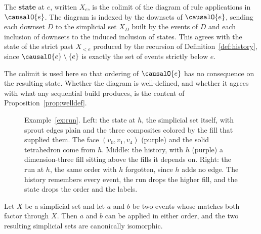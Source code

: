 \begin{definition}[State]
\label{def:state}
The \textbf{state} at $e$, written $X_e$, is the colimit of the diagram of rule applications in $\causalO{e}$.
The diagram is indexed by the downsets of $\causalO{e}$, sending each downset $D$ to the simplicial set $X_D$ built by the events of $D$ and each inclusion of downsets to the induced inclusion of states.
This agrees with the state of the strict past $X_{<e}$ produced by the recursion of Definition~\ref{def:history}, since $\causalO{e} \setminus \{e\}$ is exactly the set of events strictly below $e$.
\end{definition}

The colimit is used here so that ordering of $\causalO{e}$ has no consequence on the resulting state.
Whether the diagram is well-defined, and whether it agrees with what any sequential build produces, is the content of Proposition~\ref{prop:welldef}.

\begin{figure}[H]
  \centering
  
  \caption{Example~\ref{ex:run}.
  Left: the state at $h$, the simplicial set itself, with sprout edges plain and the three composites colored by the fill that supplied them. The face $(v_0, v_1, v_4)$ (purple) and the solid tetrahedron come from $h$.
  Middle: the history, with $h$ (purple) a dimension-three fill sitting above the fills it depends on.
  Right: the run at $h$, the same order with $h$ forgotten, since $h$ adds no edge.
  The history remembers every event, the run drops the higher fill, and the state drops the order and the labels.}
  \label{fig:examplerun}
\end{figure}

\begin{lemma}
\label{lem:exchange}
Let $X$ be a simplicial set and let $a$ and $b$ be two events whose matches both factor through $X$.
Then $a$ and $b$ can be applied in either order, and the two resulting simplicial sets are canonically isomorphic.
\end{lemma}

